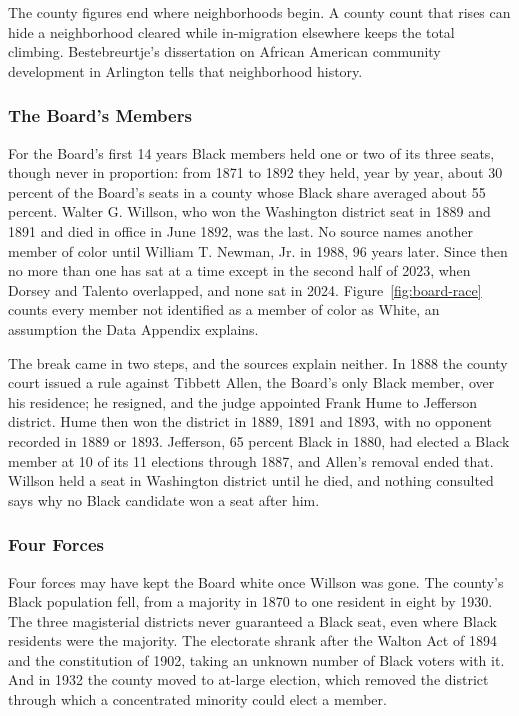 The county figures end where neighborhoods begin. A county count that rises
can hide a neighborhood cleared while in-migration elsewhere keeps the total
climbing. Bestebreurtje's
dissertation on African American community development in Arlington tells that
neighborhood history.\autocite{bestebreurtje2017}

\subsubsection{The Board's Members}

For the Board's first 14 years Black members held one or two of its three seats,
though never in proportion: from 1871 to 1892 they held, year by year, about
30 percent of the Board's seats in a county whose Black share averaged about 55
percent. Walter G.
Willson, who won the Washington district seat in 1889 and 1891 and died in
office in June 1892, was the last. No source names another member of color until
William T. Newman, Jr. in 1988, 96 years later. Since then no more than one has
sat at a time except in the second half of 2023, when Dorsey and Talento
overlapped, and none sat in 2024. Figure~\ref{fig:board-race} counts every
member not identified as a member of color as White, an assumption the Data
Appendix explains.

The break came in two steps, and the sources explain neither. In 1888 the county
court issued a rule against Tibbett Allen, the Board's only Black member, over
his residence; he resigned, and the judge appointed Frank Hume to Jefferson
district.\autocite{alexandriagazette1888rule} Hume then won the district in 1889, 1891 and 1893,
with no opponent recorded in 1889 or 1893.\autocite{alexandriagazette18890525p3,%
alexandriagazette18930526p3} Jefferson, 65 percent Black in 1880, had elected a
Black member at 10 of its 11 elections through 1887, and Allen's removal ended
that. Willson held a seat in Washington district until he died, and nothing
consulted says why no Black candidate won a seat after him.

\subsubsection{Four Forces}

Four forces may have kept the Board white once Willson was gone. The county's
Black population fell, from a majority
in 1870 to one resident in eight by 1930. The three magisterial districts never
guaranteed a Black seat, even where Black residents were the majority. The
electorate shrank after the Walton Act of 1894 and the constitution of 1902,
taking an unknown number of Black voters with it. And in 1932 the county moved
to at-large election, which removed the district through which a concentrated
minority could elect a member.

